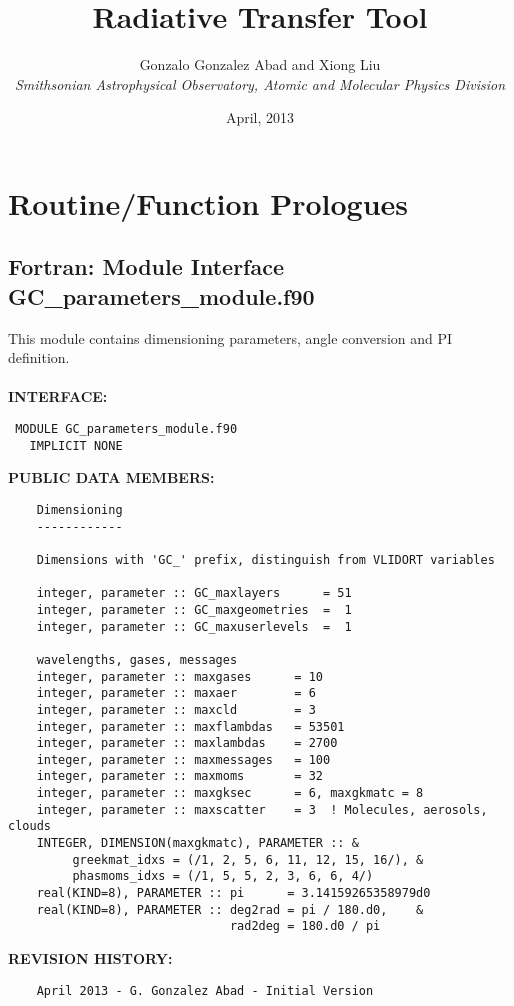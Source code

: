 \documentclass[11pt]{article}
\title{Radiative Transfer Tool}
\author{{\sc Gonzalo Gonzalez Abad and Xiong Liu}\\ {\em Smithsonian Astrophysical Observatory, Atomic and Molecular Physics Division}}
\date{April, 2013}
\begin{document}
\maketitle
\tableofcontents
\newpage
\section{Routine/Function Prologues} \label{app:ProLogues}

  \subsection{Fortran:  Module Interface GC\_parameters\_module.f90 }


  This module contains dimensioning parameters, 
   angle conversion and PI definition.
  \\
  \\{\bf INTERFACE:}
\begin{verbatim} MODULE GC_parameters_module.f90
   IMPLICIT NONE\end{verbatim}{\bf PUBLIC DATA MEMBERS:}
\begin{verbatim}    Dimensioning
    ------------
 
    Dimensions with 'GC_' prefix, distinguish from VLIDORT variables
 
    integer, parameter :: GC_maxlayers      = 51
    integer, parameter :: GC_maxgeometries  =  1
    integer, parameter :: GC_maxuserlevels  =  1
 
    wavelengths, gases, messages
    integer, parameter :: maxgases      = 10
    integer, parameter :: maxaer        = 6
    integer, parameter :: maxcld        = 3
    integer, parameter :: maxflambdas   = 53501
    integer, parameter :: maxlambdas    = 2700
    integer, parameter :: maxmessages   = 100
    integer, parameter :: maxmoms       = 32
    integer, parameter :: maxgksec      = 6, maxgkmatc = 8
    integer, parameter :: maxscatter    = 3  ! Molecules, aerosols, clouds
    INTEGER, DIMENSION(maxgkmatc), PARAMETER :: &
         greekmat_idxs = (/1, 2, 5, 6, 11, 12, 15, 16/), &
         phasmoms_idxs = (/1, 5, 5, 2, 3, 6, 6, 4/)
    real(KIND=8), PARAMETER :: pi      = 3.14159265358979d0
    real(KIND=8), PARAMETER :: deg2rad = pi / 180.d0,    &
                               rad2deg = 180.d0 / pi
 \end{verbatim}{\bf REVISION HISTORY:}
\begin{verbatim}    April 2013 - G. Gonzalez Abad - Initial Version\end{verbatim}

\end{document}
